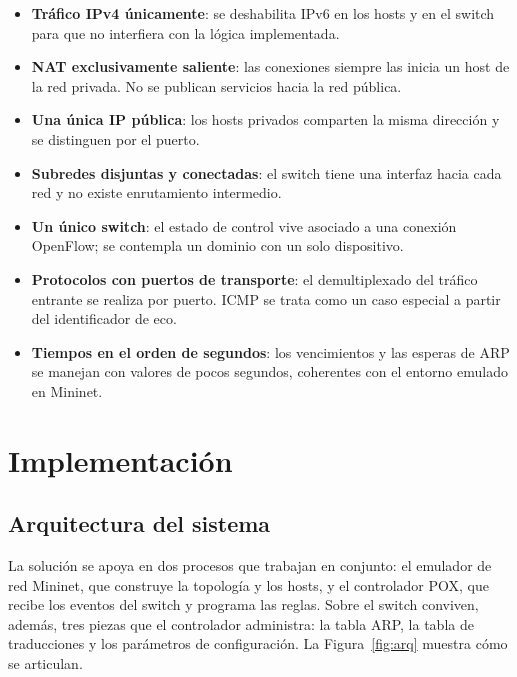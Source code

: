 ﻿\documentclass[10pt,a4paper]{article}
\begin{document}
\begin{itemize}[nosep]
\itemsep=2pt
  \item \textbf{Tráfico IPv4 únicamente}: se deshabilita IPv6 en los hosts y en el
          switch para que no interfiera con la lógica implementada.
  \item \textbf{NAT exclusivamente saliente}: las conexiones siempre las inicia
          un host de la red privada. No se publican servicios hacia la red pública.
  \item \textbf{Una única IP pública}: los hosts privados comparten
          la misma dirección y se distinguen por el puerto.
  \item \textbf{Subredes disjuntas y conectadas}: el switch tiene una interfaz
          hacia cada red y no existe enrutamiento intermedio.
  \item \textbf{Un único switch}: el estado de control vive asociado a una
          conexión OpenFlow; se contempla un dominio con un solo dispositivo.
  \item \textbf{Protocolos con puertos de transporte}: el demultiplexado del
          tráfico entrante se realiza por puerto. ICMP se trata como un caso
          especial a partir del identificador de eco.
  \item \textbf{Tiempos en el orden de segundos}: los vencimientos y las esperas
          de ARP se manejan con valores de pocos segundos, coherentes con el
          entorno emulado en Mininet.
\end{itemize}

\section{Implementación}
\subsection{Arquitectura del sistema}

La solución se apoya en dos procesos que trabajan en conjunto: el emulador de red
Mininet, que construye la topología y los hosts, y el controlador POX, que recibe
los eventos del switch y programa las reglas. Sobre el switch conviven, además, tres
piezas que el controlador administra: la tabla ARP, la tabla de traducciones y los
parámetros de configuración. La Figura~\ref{fig:arq} muestra cómo se articulan.
\end{document}
